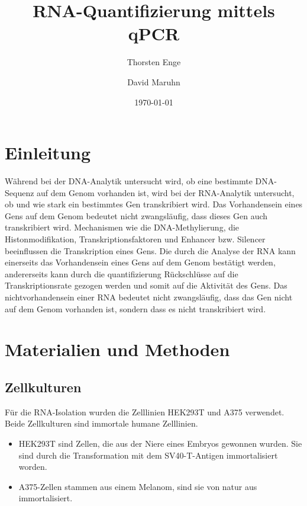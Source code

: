 \documentclass{article}
\title{RNA-Quantifizierung mittels qPCR}
\author{Thorsten Enge \and David Maruhn}
\date{\today}
\begin{document}
\maketitle

\tableofcontents
\newpage

\section{Einleitung}

Während bei der DNA-Analytik untersucht wird, ob eine bestimmte
DNA-Sequenz auf dem Genom vorhanden ist, wird bei der RNA-Analytik
untersucht, ob und wie stark ein bestimmtes Gen transkribiert wird.
Das Vorhandensein eines Gens auf dem Genom bedeutet nicht zwangsläufig,
dass dieses Gen auch transkribiert wird. Mechanismen wie die
DNA-Methylierung, die Histonmodifikation, Transkriptionsfaktoren und
Enhancer bzw. Silencer beeinflussen die Transkription eines Gens.
Die durch die Analyse der RNA kann einerseits das Vorhandensein eines
Gens auf dem Genom bestätigt werden, andererseits kann durch die
quantifizierung Rückschlüsse auf die Transkriptionsrate gezogen werden
und somit auf die Aktivität des Gens. Das nichtvorhandensein einer RNA
bedeutet nicht zwangsläufig, dass das Gen nicht auf dem Genom vorhanden
ist, sondern dass es nicht transkribiert wird.


\section{Materialien und Methoden}

\subsection*{Zellkulturen}
Für die RNA-Isolation wurden die Zelllinien HEK293T und A375 verwendet.
Beide Zellkulturen sind immortale humane Zelllinien.
\begin{itemize}
    \item HEK293T sind Zellen, die aus der Niere eines Embryos gewonnen wurden.
    Sie sind durch die Transformation mit dem SV40-T-Antigen immortalisiert
    worden.
    \item A375-Zellen stammen aus einem Melanom, sind sie von natur aus
    immortalisiert.
\end{itemize}
\end{document}
